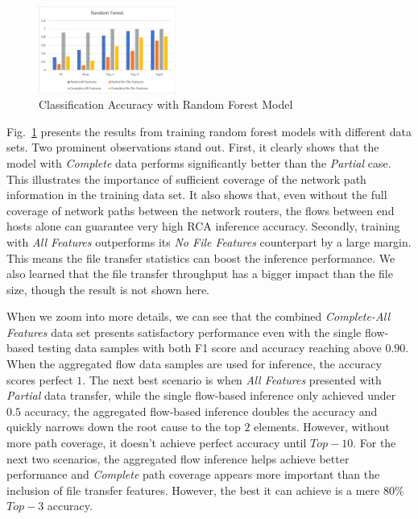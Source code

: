 \begin{figure}[!ht]
\begin{center}
\includegraphics[width=0.4\textwidth]{./figure/rf-accuracy}
\end{center}
\caption{Classification Accuracy with Random Forest Model}
\label{fig:dt}
\vspace{-0.1in}
\end{figure}

Fig.~\ref{fig:dt} presents the results from training random forest models with different data sets. Two prominent observations stand out. 
First, it clearly shows that the model with {\it Complete} data performs significantly better than the {\it Partial} case. This illustrates the importance of sufficient 
coverage of the network path information in the training data set. It also shows that, even without the full coverage of network paths between the network routers, 
the flows between end hosts alone can guarantee very high RCA inference accuracy.   
Secondly, training with {\it All Features} outperforms its {\it No File Features} counterpart by a large margin. This means the file transfer statistics can boost the inference performance.  
We also learned that the file transfer throughput has a bigger impact than the file size, though the result is not shown here. 

When we zoom into more details, we can see that the combined {\it Complete-All Features} data set presents satisfactory performance even with the single flow-based testing data samples with 
both F1 score and accuracy reaching above $0.90$. When the aggregated flow data samples are used for inference, the accuracy scores perfect $1$. The next best scenario is when {\it All Features} presented with 
{\it Partial} data transfer, while the single flow-based inference only achieved under $0.5$ accuracy, the aggregated flow-based inference doubles the accuracy and quickly narrows down the root cause to the 
top $2$ elements. However, without more path coverage, it doesn't achieve perfect accuracy until $Top-10$. For the next two scenarios, the aggregated flow inference helps achieve better performance 
and {\it Complete} path coverage appears more important than the inclusion of file transfer features. However, the best it can achieve is a mere $80\%$ $Top-3$ accuracy.  

